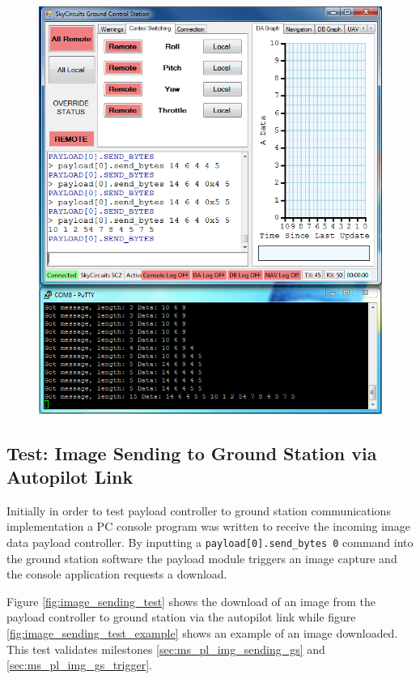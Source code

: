 \begin{figure}[H]
        \centering
        \includegraphics[width=1.0\textwidth]{testing_screenshots/send_bytes_test.png}
        \label{fig:send_bytes_test}
\end{figure}


\subsection{Test: Image Sending to Ground Station via Autopilot Link}
\label{sec:test_pl_image_send}
Initially in order to test payload controller to ground station communications implementation
a PC console program was written to receive the incoming image data payload controller. By
inputting a \verb+payload[0].send_bytes 0+ command into the ground station software
the payload module triggers an image capture and the console application requests a download.

Figure \ref{fig:image_sending_test} shows the download of an image from the payload controller to
ground station via the autopilot link while figure \ref{fig:image_sending_test_example} shows an example
of an image downloaded. This test validates milestones \ref{sec:ms_pl_img_sending_gs} and \ref{sec:ms_pl_img_gs_trigger}.

